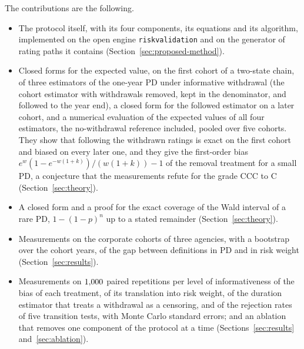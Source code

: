 The contributions are the following.
\begin{itemize}
\item The protocol itself, with its four components, its equations and its algorithm, implemented on the open engine \texttt{riskvalidation} and on the generator of rating paths it contains (Section~\ref{sec:proposed-method}).
\item Closed forms for the expected value, on the first cohort of a two-state chain, of three estimators of the one-year PD under informative withdrawal (the cohort estimator with withdrawals removed, kept in the denominator, and followed to the year end), a closed form for the followed estimator on a later cohort, and a numerical evaluation of the expected values of all four estimators, the no-withdrawal reference included, pooled over five cohorts. They show that following the withdrawn ratings is exact on the first cohort and biased on every later one, and they give the first-order bias $e^{w}(1-e^{-w(1+k)})/(w(1+k))-1$ of the removal treatment for a small PD, a conjecture that the measurements refute for the grade CCC to C (Section~\ref{sec:theory}). %
\item A closed form and a proof for the exact coverage of the Wald interval of a rare PD, $1-(1-p)^n$ up to a stated remainder (Section~\ref{sec:theory}).
\item Measurements on the corporate cohorts of three agencies, with a bootstrap over the cohort years, of the gap between definitions in PD and in risk weight (Section~\ref{sec:results}).
\item Measurements on $1{,}000$ paired repetitions per level of informativeness of the bias of each treatment, of its translation into risk weight, of the duration estimator that treats a withdrawal as a censoring, and of the rejection rates of five transition tests, with Monte Carlo standard errors; and an ablation that removes one component of the protocol at a time (Sections~\ref{sec:results} and~\ref{sec:ablation}).
\end{itemize}

